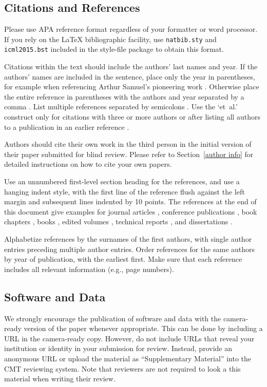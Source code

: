 \documentclass{article}
\begin{document}
\subsection{Citations and References} 

Please use APA reference format regardless of your formatter
or word processor. If you rely on the \LaTeX\/ bibliographic 
facility, use {\tt natbib.sty} and {\tt icml2015.bst} 
included in the style-file package to obtain this format.

Citations within the text should include the authors' last names and
year. If the authors' names are included in the sentence, place only
the year in parentheses, for example when referencing Arthur Samuel's
pioneering work . Otherwise place the entire
reference in parentheses with the authors and year separated by a
comma \cite{Samuel59}. List multiple references separated by
semicolons \cite{kearns89,Samuel59,mitchell80}. Use the `et~al.'
construct only for citations with three or more authors or after
listing all authors to a publication in an earlier reference \cite{MachineLearningI}.

Authors should cite their own work in the third person
in the initial version of their paper submitted for blind review.
Please refer to Section~\ref{author info} for detailed instructions on how to
cite your own papers.

Use an unnumbered first-level section heading for the references, and 
use a hanging indent style, with the first line of the reference flush
against the left margin and subsequent lines indented by 10 points. 
The references at the end of this document give examples for journal
articles \cite{Samuel59}, conference publications \cite{langley00}, book chapters \cite{Newell81}, books \cite{DudaHart2nd}, edited volumes \cite{MachineLearningI}, 
technical reports \cite{mitchell80}, and dissertations \cite{kearns89}. 

Alphabetize references by the surnames of the first authors, with
single author entries preceding multiple author entries. Order
references for the same authors by year of publication, with the
earliest first. Make sure that each reference includes all relevant
information (e.g., page numbers).

\subsection{Software and Data}

We strongly encourage the publication of software and data with the
camera-ready version of the paper whenever appropriate.  This can be
done by including a URL in the camera-ready copy.  However, do not
include URLs that reveal your institution or identity in your
submission for review.  Instead, provide an anonymous URL or upload
the material as ``Supplementary Material'' into the CMT reviewing
system.  Note that reviewers are not required to look a this material
when writing their review.
\end{document}

